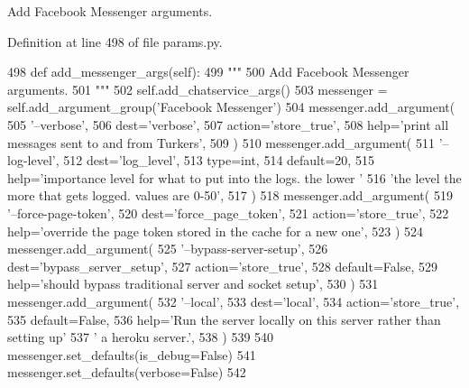 \begin{DoxyVerb}Add Facebook Messenger arguments.
\end{DoxyVerb}
 

Definition at line 498 of file params.\+py.


\begin{DoxyCode}
498     \textcolor{keyword}{def }add\_messenger\_args(self):
499         \textcolor{stringliteral}{"""}
500 \textcolor{stringliteral}{        Add Facebook Messenger arguments.}
501 \textcolor{stringliteral}{        """}
502         self.add\_chatservice\_args()
503         messenger = self.add\_argument\_group(\textcolor{stringliteral}{'Facebook Messenger'})
504         messenger.add\_argument(
505             \textcolor{stringliteral}{'--verbose'},
506             dest=\textcolor{stringliteral}{'verbose'},
507             action=\textcolor{stringliteral}{'store\_true'},
508             help=\textcolor{stringliteral}{'print all messages sent to and from Turkers'},
509         )
510         messenger.add\_argument(
511             \textcolor{stringliteral}{'--log-level'},
512             dest=\textcolor{stringliteral}{'log\_level'},
513             type=int,
514             default=20,
515             help=\textcolor{stringliteral}{'importance level for what to put into the logs. the lower '}
516             \textcolor{stringliteral}{'the level the more that gets logged. values are 0-50'},
517         )
518         messenger.add\_argument(
519             \textcolor{stringliteral}{'--force-page-token'},
520             dest=\textcolor{stringliteral}{'force\_page\_token'},
521             action=\textcolor{stringliteral}{'store\_true'},
522             help=\textcolor{stringliteral}{'override the page token stored in the cache for a new one'},
523         )
524         messenger.add\_argument(
525             \textcolor{stringliteral}{'--bypass-server-setup'},
526             dest=\textcolor{stringliteral}{'bypass\_server\_setup'},
527             action=\textcolor{stringliteral}{'store\_true'},
528             default=\textcolor{keyword}{False},
529             help=\textcolor{stringliteral}{'should bypass traditional server and socket setup'},
530         )
531         messenger.add\_argument(
532             \textcolor{stringliteral}{'--local'},
533             dest=\textcolor{stringliteral}{'local'},
534             action=\textcolor{stringliteral}{'store\_true'},
535             default=\textcolor{keyword}{False},
536             help=\textcolor{stringliteral}{'Run the server locally on this server rather than setting up'}
537             \textcolor{stringliteral}{' a heroku server.'},
538         )
539 
540         messenger.set\_defaults(is\_debug=\textcolor{keyword}{False})
541         messenger.set\_defaults(verbose=\textcolor{keyword}{False})
542 
\end{DoxyCode}
\mbox{\label{classparlai_1_1core_1_1params_1_1ParlaiParser_af05d40e27abb0740948fdccfde5b8808}} 
